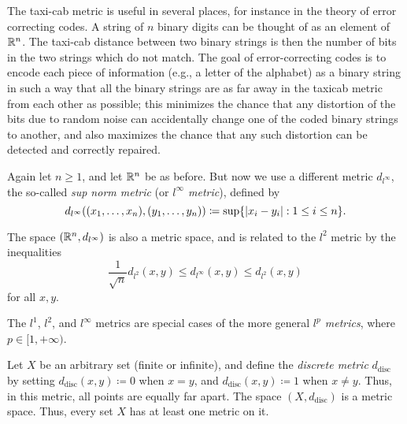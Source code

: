 \begin{rmk}\label{ii:1.1.8}
  The taxi-cab metric is useful in several places, for instance in the theory of error correcting codes.
  A string of \(n\) binary digits can be thought of as an element of \(\mathbb{R}^n\).
  The taxi-cab distance between two binary strings is then the number of bits in the two strings which do not match.
  The goal of error-correcting codes is to encode each piece of information (e.g., a letter of the alphabet) as a binary string in such a way that all the binary strings are as far away in the taxicab metric from each other as possible;
  this minimizes the chance that any distortion of the bits due to random noise can accidentally change one of the coded binary strings to another, and also maximizes the chance that any such distortion can be detected and correctly repaired.
\end{rmk}

\begin{eg}\label{ii:1.1.9}
  Again let \(n \geq 1\), and let \(\mathbb{R}^n\) be as before.
  But now we use a different metric \(d_{l^\infty}\), the so-called \emph{sup norm metric} (or \emph{\(l^\infty\) metric}), defined by
  \[
    d_{l^\infty} ((x_1, \dots, x_n), (y_1, \dots, y_n)) \coloneqq \sup\set{\abs{x_i - y_i} : 1 \leq i \leq n}.
  \]
\end{eg}

\begin{note}
  The space \((\mathbb{R}^n, d_{l^\infty})\) is also a metric space, and is related to the \(l^2\) metric by the inequalities
  \[
    \dfrac{1}{\sqrt{n}} d_{l^2}(x, y) \leq d_{l^\infty}(x, y) \leq d_{l^2}(x, y)
  \]
  for all \(x, y\).
\end{note}

\begin{rmk}\label{ii:1.1.10}
  The \(l^1\), \(l^2\), and \(l^\infty\) metrics are special cases of the more general \emph{\(l^p\) metrics}, where \(p \in [1, +\infty)\).
\end{rmk}

\begin{eg}\label{ii:1.1.11}
  Let \(X\) be an arbitrary set (finite or infinite), and define the \emph{discrete metric} \(d_{\text{disc}}\) by setting \(d_{\text{disc}}(x, y) \coloneqq 0\) when \(x = y\), and \(d_{\text{disc}}(x, y) \coloneqq 1\) when \(x \neq y\).
  Thus, in this metric, all points are equally far apart.
  The space \((X, d_{\text{disc}})\) is a metric space.
  Thus, every set \(X\) has at least one metric on it.
\end{eg}

